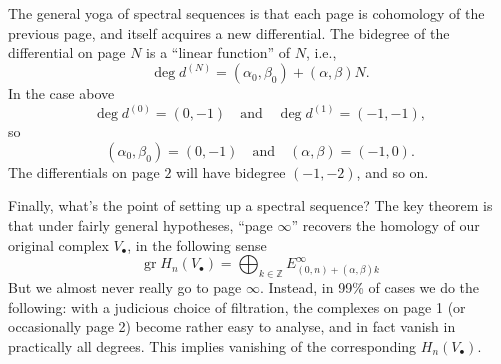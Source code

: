 \documentclass[12pt]{article}
\theoremstyle{plain}
\theoremstyle{definition}
\numberwithin{equation}{section}
\DeclareMathOperator{\gr}{gr}
\newcommand{\Z}{\mathbb{Z}}
\begin{document}
The general yoga of spectral sequences is that each page is cohomology of the previous page, and itself acquires a new differential. The bidegree of the differential on page $N$ is a ``linear function'' of $N$, i.e.,
\[
\deg d^{(N)} = (\alpha_0, \beta_0) + (\alpha, \beta) N.
\]
In the case above
\[
\deg d^{(0)} = (0, -1) \quad \text{and} \quad \deg d^{(1)} = (-1, -1),
\]
so
\[
(\alpha_0, \beta_0) = (0, -1) \quad \text{and} \quad (\alpha, \beta) = (-1, 0).
\]
The differentials on page $2$ will have bidegree $(-1, -2)$, and so on.


Finally, what's the point of setting up a spectral sequence? The key theorem is that under fairly general hypotheses, ``page $\infty$'' recovers the homology of our original complex $V_\bullet$, in the following sense
\[
\gr H_n(V_\bullet) = \bigoplus_{k \in \Z} E^\infty_{(0, n) + (\alpha, \beta)k}
\]
But we almost never really go to page $\infty$. Instead, in 99\% of cases we do the following: with a judicious choice of filtration, the complexes on page 1 (or occasionally page 2) become rather easy to analyse, and in fact vanish in practically all degrees. This implies vanishing of the corresponding $H_n(V_\bullet)$.
\end{document}
